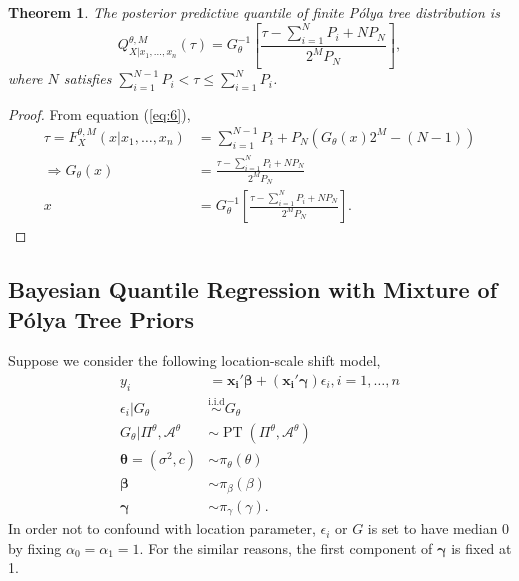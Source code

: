 \documentclass[12pt]{article}
\newtheorem{thm}{Theorem}[subsection]
\newcommand{\polya}{P\'{o}lya}
\newcommand{\iid}{\stackrel{\text{i.i.d}}{\sim}}
\DeclareMathOperator{\pt}{PT}
\begin{document}
\begin{thm}
  The posterior predictive quantile of finite \polya{} tree
  distribution is 
  \begin{equation}
    \label{eq:7}
    Q^{\theta, M}_{X|x_1, \ldots, x_n}(\tau) = G^{-1}_{\theta} \left[
      \frac{\tau- \sum_{i=1}^N P_i + N P_N}{2^M P_N} \right],
  \end{equation}
  where $N$ satisfies $ \sum_{i=1}^{N-1} P_i < \tau \le \sum_{i=1}^N P_i$.
\end{thm}

\begin{proof}
  From equation (\ref{eq:6}), 
  \begin{align*}
    \tau = F^{\theta,M}_X(x|x_1, \ldots, x_n) &= \sum_{i=1}^{N-1} P_{i} + P_N
    \left( G_{\theta}(x)2^M -(N-1) \right) \\
    \Rightarrow G_{\theta}(x) &= \frac{\tau - \sum_{i=1}^NP_i +
      NP_N}{2^MP_N} \\
    x & = G_{\theta}^{-1} \left[\frac{\tau - \sum_{i=1}^NP_i +
        NP_N}{2^MP_N}  \right].
  \end{align*}
\end{proof}

\subsection{Bayesian Quantile Regression with Mixture of \polya{}
  Tree Priors}
Suppose we consider the following location-scale shift model, 
\begin{align*}
  y_i& = \bm{x_i'\beta} + (\bm{x_i'\gamma}) \epsilon_{i}, i = 1, \ldots,
  n \\
  \epsilon_i |G_{\theta} & \iid G_{\theta} \\
  G_{\theta}|\Pi^{\theta}, \mathcal{A}^{\theta} & \sim \pt
  (\Pi^{\theta}, \mathcal{A}^{\theta}) \\
  \bm{\theta} = (\sigma^2, c) & \sim \pi_{\theta}(\theta) \\
  \bm{\beta} & \sim \pi_{\beta}(\beta)\\
  \bm{\gamma} &\sim \pi_{\gamma}(\gamma).
\end{align*} 
In order not to confound with location parameter, $\epsilon_i $ or $G$
is set to have median 0 by fixing $\alpha_0=\alpha_1 = 1$. For the
similar reasons,
the first component of $\bm{\gamma}$ is fixed
at 1. 
\end{document}

